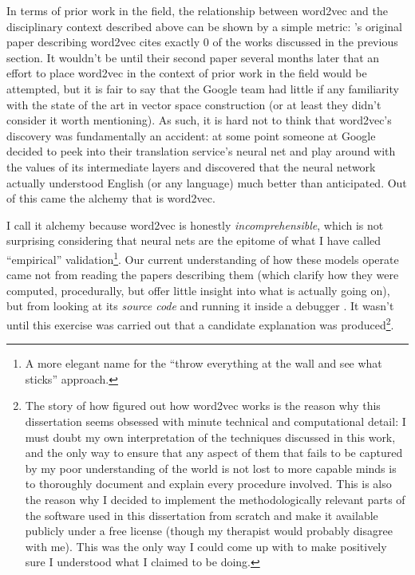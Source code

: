 In terms of prior work in the field, the relationship between word2vec and the disciplinary context described above can be shown by a simple metric: \citeauthor{mikolov2013}'s original paper describing word2vec cites exactly $0$ of the works discussed in the previous section.
It wouldn't be until their second paper several months later \citep{mikolov2013a} that an effort to place word2vec in the context of prior work in the field would be attempted, but it is fair to say that the Google team had little if any familiarity with the state of the art in vector space construction (or at least they didn't consider it worth mentioning).
As such, it is hard not to think that word2vec's discovery was fundamentally an accident: at some point someone at Google decided to peek into their translation service's neural net and play around with the values of its intermediate layers and discovered that the neural network actually understood English (or any language) much better than anticipated.
Out of this came the alchemy that is word2vec.

I call it alchemy because word2vec is honestly \emph{incomprehensible}, which is not surprising considering that neural nets are the epitome of what I have called ``empirical'' validation\footnote{
    A more elegant name for the ``throw everything at the wall and see what sticks'' approach.
}.
Our current understanding of how these models operate came not from reading the papers describing them (which clarify how they were computed, procedurally, but offer little insight into what is actually going on), but from looking at its \emph{source code} and running it inside a debugger \citep{goldberg2014}.
It wasn't until this exercise was carried out that a candidate explanation was produced\footnote{
    The story of how \citeauthor{goldberg2014,levy2014} figured out how word2vec works is the reason why this dissertation seems obsessed with minute technical and computational detail:
    I must doubt my own interpretation of the techniques discussed in this work, and the only way to ensure that any aspect of them that fails to be captured by my poor understanding of the world is not lost to more capable minds is to thoroughly document and explain every procedure involved.
    This is also the reason why I decided to implement the methodologically relevant parts of the software used in this dissertation from scratch and make it available publicly under a free license (though my therapist would probably disagree with me).
    This was the only way I could come up with to make positively sure I understood what I claimed to be doing.
}.

